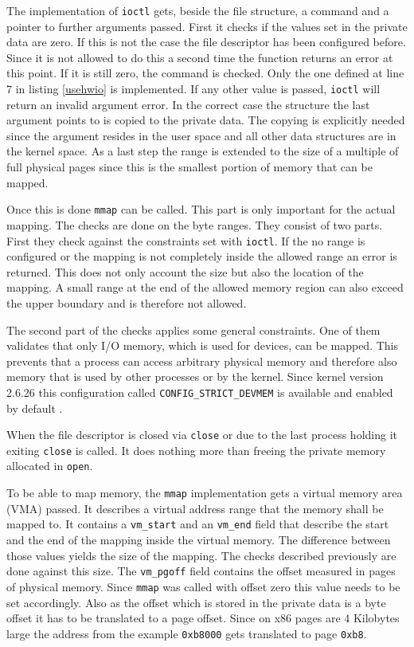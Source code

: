 \documentclass[
a4paper,
11pt,
twoside
]{report}
\begin{document}
		The implementation of \texttt{ioctl} gets, beside the file structure, a command and a pointer to further arguments passed.
		First it checks if the values set in the private data are zero.
		If this is not the case the file descriptor has been configured before.
		Since it is not allowed to do this a second time the function returns an error at this point.
		If it is still zero, the command is checked.
		Only the one defined at line 7 in listing \ref{usehwio} is implemented.
		If any other value is passed, \texttt{ioctl} will return an invalid argument error.
		In the correct case the structure the last argument points to is copied to the private data.
		The copying is explicitly needed since the argument resides in the user space and all other data structures are in the kernel space.
		As a last step the range is extended to the size of a multiple of full physical pages since this is the smallest portion of memory that can be mapped.
		
		Once this is done \texttt{mmap} can be called.
		This part is only important for the actual mapping.
		The checks are done on the byte ranges.
		They consist of two parts.
		First they check against the constraints set with \texttt{ioctl}.
		If the no range is configured or the mapping is not completely inside the allowed range an error is returned.
		This does not only account the size but also the location of the mapping.
		A small range at the end of the allowed memory region can also exceed the upper boundary and is therefore not allowed.
		
		The second part of the checks applies some general constraints.
		One of them validates that only I/O memory, which is used for devices, can be mapped.
		This prevents that a process can access arbitrary physical memory and therefore also memory that is used by other processes or by the kernel.
		Since kernel version 2.6.26 this configuration called \texttt{CONFIG\_STRICT\_DEVMEM} is available and enabled by default \citep{devmem}.
		
		When the file descriptor is closed via \texttt{close} or due to the last process holding it exiting \texttt{close} is called.
		It does nothing more than freeing the private memory allocated in \texttt{open}.
		
		To be able to map memory, the \texttt{mmap} implementation gets a virtual memory area (VMA) passed.
		It describes a virtual address range that the memory shall be mapped to.
		It contains a \texttt{vm\_start} and an \texttt{vm\_end} field that describe the start and the end of the mapping inside the virtual memory.
		The difference between those values yields the size of the mapping.
		The checks described previously are done against this size.
		The \texttt{vm\_pgoff} field contains the offset measured in pages of physical memory.
		Since \texttt{mmap} was called with offset zero this value needs to be set accordingly.
		Also as the offset which is stored in the private data is a byte offset it has to be translated to a page offset.
		Since on x86 pages are 4 Kilobytes large the address from the example \texttt{0xb8000} gets translated to page \texttt{0xb8}.
		
\end{document}
